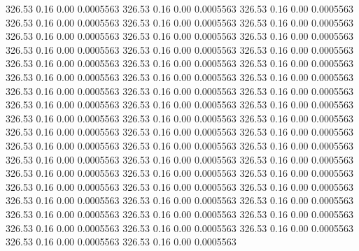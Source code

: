  326.53    0.16    0.00   0.0005563
 326.53    0.16    0.00   0.0005563
 326.53    0.16    0.00   0.0005563
 326.53    0.16    0.00   0.0005563
 326.53    0.16    0.00   0.0005563
 326.53    0.16    0.00   0.0005563
 326.53    0.16    0.00   0.0005563
 326.53    0.16    0.00   0.0005563
 326.53    0.16    0.00   0.0005563
 326.53    0.16    0.00   0.0005563
 326.53    0.16    0.00   0.0005563
 326.53    0.16    0.00   0.0005563
 326.53    0.16    0.00   0.0005563
 326.53    0.16    0.00   0.0005563
 326.53    0.16    0.00   0.0005563
 326.53    0.16    0.00   0.0005563
 326.53    0.16    0.00   0.0005563
 326.53    0.16    0.00   0.0005563
 326.53    0.16    0.00   0.0005563
 326.53    0.16    0.00   0.0005563
 326.53    0.16    0.00   0.0005563
 326.53    0.16    0.00   0.0005563
 326.53    0.16    0.00   0.0005563
 326.53    0.16    0.00   0.0005563
 326.53    0.16    0.00   0.0005563
 326.53    0.16    0.00   0.0005563
 326.53    0.16    0.00   0.0005563
 326.53    0.16    0.00   0.0005563
 326.53    0.16    0.00   0.0005563
 326.53    0.16    0.00   0.0005563
 326.53    0.16    0.00   0.0005563
 326.53    0.16    0.00   0.0005563
 326.53    0.16    0.00   0.0005563
 326.53    0.16    0.00   0.0005563
 326.53    0.16    0.00   0.0005563
 326.53    0.16    0.00   0.0005563
 326.53    0.16    0.00   0.0005563
 326.53    0.16    0.00   0.0005563
 326.53    0.16    0.00   0.0005563
 326.53    0.16    0.00   0.0005563
 326.53    0.16    0.00   0.0005563
 326.53    0.16    0.00   0.0005563
 326.53    0.16    0.00   0.0005563
 326.53    0.16    0.00   0.0005563
 326.53    0.16    0.00   0.0005563
 326.53    0.16    0.00   0.0005563
 326.53    0.16    0.00   0.0005563
 326.53    0.16    0.00   0.0005563
 326.53    0.16    0.00   0.0005563
 326.53    0.16    0.00   0.0005563
 326.53    0.16    0.00   0.0005563
 326.53    0.16    0.00   0.0005563
 326.53    0.16    0.00   0.0005563
